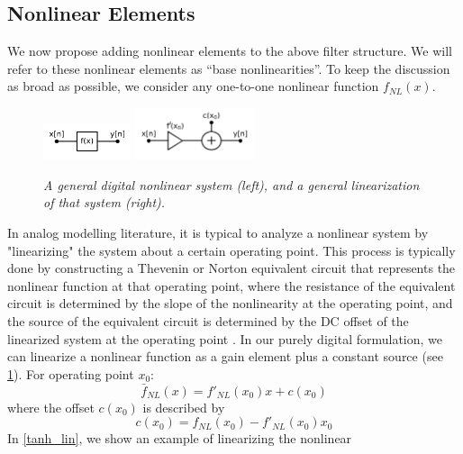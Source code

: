 \documentclass{IEEEtran}
\begin{document}
\subsection{Nonlinear Elements}
%
We now propose adding nonlinear elements to the above filter structure.
We will refer to these nonlinear elements as ``base nonlinearities''.
To keep the discussion as broad as possible, we consider any one-to-one
nonlinear function $f_{NL}(x)$.
\newline\newline
%
\begin{figure}[!ht]
    \center
    \includegraphics[width=1.0in]{../Pics/NL_sys_trim_white.png}
    \includegraphics[width=1.4in]{../Pics/NL_sys_lin_white.png}
    \caption{\label{linize}{\it A general digital nonlinear system (left),
                                and a general linearization of that system (right).}}
\end{figure}
%
In analog modelling literature, it is typical to analyze a nonlinear
system by "linearizing" the system about a certain operating
point. This process is typically done by constructing a Thevenin or
Norton equivalent circuit that represents the nonlinear function at
that operating point, where the resistance of the equivalent circuit
is determined by the slope of the nonlinearity at the operating point,
and the source of the equivalent circuit is determined by the DC
offset of the linearized system at the operating point
\cite{BernersDAFX}.
\newline\newline
In our purely digital formulation, we can linearize a nonlinear function
as a gain element plus a constant source (see \cref{linize}).
%
For operating point $x_0$:
%
\begin{equation}
    \bar{f}_{NL}(x) = f'_{NL}(x_0)x + c(x_0)
    \label{eq:linearized}
\end{equation}
%
where the offset $c(x_0)$ is described by
%
\begin{equation}
    c(x_0) = f_{NL}(x_0) - f'_{NL}(x_0)x_0
    \label{eq:lin_off}
\end{equation}
%
In \cref{tanh_lin}, we show an example of linearizing the nonlinear
\end{document}
